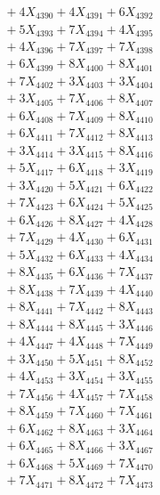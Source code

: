 \documentclass[a4paper,10pt]{article}
\begin{document}
{\begin{align}
&\;  + 4 X_{4390} + 4 X_{4391} + 6 X_{4392} \\[0.3ex]
&\;  + 5 X_{4393} + 7 X_{4394} + 4 X_{4395} \\[0.3ex]
&\;  + 4 X_{4396} + 7 X_{4397} + 7 X_{4398} \\[0.3ex]
&\;  + 6 X_{4399} + 8 X_{4400} + 8 X_{4401} \\[0.3ex]
&\;  + 7 X_{4402} + 3 X_{4403} + 3 X_{4404} \\[0.3ex]
&\;  + 3 X_{4405} + 7 X_{4406} + 8 X_{4407} \\[0.3ex]
&\;  + 6 X_{4408} + 7 X_{4409} + 8 X_{4410} \\[0.3ex]
&\;  + 6 X_{4411} + 7 X_{4412} + 8 X_{4413} \\[0.3ex]
&\;  + 3 X_{4414} + 3 X_{4415} + 8 X_{4416} \\[0.3ex]
&\;  + 5 X_{4417} + 6 X_{4418} + 3 X_{4419} \\[0.5ex]\allowbreak
&\;  + 3 X_{4420} + 5 X_{4421} + 6 X_{4422} \\[0.3ex]
&\;  + 7 X_{4423} + 6 X_{4424} + 5 X_{4425} \\[0.3ex]
&\;  + 6 X_{4426} + 8 X_{4427} + 4 X_{4428} \\[0.3ex]
&\;  + 7 X_{4429} + 4 X_{4430} + 6 X_{4431} \\[0.3ex]
&\;  + 5 X_{4432} + 6 X_{4433} + 4 X_{4434} \\[0.3ex]
&\;  + 8 X_{4435} + 6 X_{4436} + 7 X_{4437} \\[0.3ex]
&\;  + 8 X_{4438} + 7 X_{4439} + 4 X_{4440} \\[0.3ex]
&\;  + 8 X_{4441} + 7 X_{4442} + 8 X_{4443} \\[0.3ex]
&\;  + 8 X_{4444} + 8 X_{4445} + 3 X_{4446} \\[0.3ex]
&\;  + 4 X_{4447} + 4 X_{4448} + 7 X_{4449} \\[0.5ex]\allowbreak
&\;  + 3 X_{4450} + 5 X_{4451} + 8 X_{4452} \\[0.3ex]
&\;  + 4 X_{4453} + 3 X_{4454} + 3 X_{4455} \\[0.3ex]
&\;  + 7 X_{4456} + 4 X_{4457} + 7 X_{4458} \\[0.3ex]
&\;  + 8 X_{4459} + 7 X_{4460} + 7 X_{4461} \\[0.3ex]
&\;  + 6 X_{4462} + 8 X_{4463} + 3 X_{4464} \\[0.3ex]
&\;  + 6 X_{4465} + 8 X_{4466} + 3 X_{4467} \\[0.3ex]
&\;  + 6 X_{4468} + 5 X_{4469} + 7 X_{4470} \\[0.3ex]
&\;  + 7 X_{4471} + 8 X_{4472} + 7 X_{4473} \\[0.3ex]

\end{align}}
\end{document}

